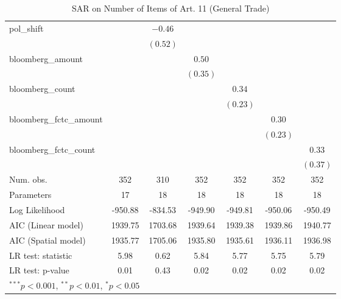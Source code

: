 \begin{table}[!h]
\begin{center}
\begin{tabular}{l c c c c c c }
pol\_shift              &              & $-0.46$      &              &              &              &              \\
                        &              & $(0.52)$     &              &              &              &              \\
bloomberg\_amount       &              &              & $0.50$       &              &              &              \\
                        &              &              & $(0.35)$     &              &              &              \\
bloomberg\_count        &              &              &              & $0.34$       &              &              \\
                        &              &              &              & $(0.23)$     &              &              \\
bloomberg\_fctc\_amount &              &              &              &              & $0.30$       &              \\
                        &              &              &              &              & $(0.23)$     &              \\
bloomberg\_fctc\_count  &              &              &              &              &              & $0.33$       \\
                        &              &              &              &              &              & $(0.37)$     \\
\midrule
Num. obs.               & 352          & 310          & 352          & 352          & 352          & 352          \\
Parameters              & 17           & 18           & 18           & 18           & 18           & 18           \\
Log Likelihood          & -950.88      & -834.53      & -949.90      & -949.81      & -950.06      & -950.49      \\
AIC (Linear model)      & 1939.75      & 1703.68      & 1939.64      & 1939.38      & 1939.86      & 1940.77      \\
AIC (Spatial model)     & 1935.77      & 1705.06      & 1935.80      & 1935.61      & 1936.11      & 1936.98      \\
LR test: statistic      & 5.98         & 0.62         & 5.84         & 5.77         & 5.75         & 5.79         \\
LR test: p-value        & 0.01         & 0.43         & 0.02         & 0.02         & 0.02         & 0.02         \\
\bottomrule
\multicolumn{7}{l}{\scriptsize{$^{***}p<0.001$, $^{**}p<0.01$, $^*p<0.05$}}
\end{tabular}
\caption{SAR on Number of Items of Art. 11 (General Trade)}
\label{table:coefficients}
\end{center}
\end{table}
